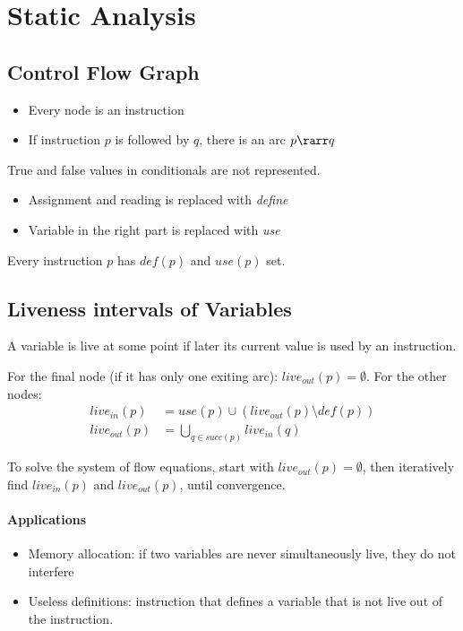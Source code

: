 \section{Static Analysis}

\subsection{Control Flow Graph}
\begin{itemize}
    \item Every node is an instruction
    \item If instruction $p$ is followed by $q$, there is an arc $p\rarr q$
\end{itemize}

True and false values in conditionals are not represented.
\begin{itemize}
    \item Assignment and reading is replaced with \emph{define}
    \item Variable in the right part is replaced with \emph{use}
\end{itemize}

Every instruction $p$ has $def(p)$ and $use(p)$ set.

\subsection{Liveness intervals of Variables}
A variable is live at some point if later its current value is used by an instruction.

For the final node (if it has only one exiting arc): $live_{out}(p) = \emptyset$. For the other nodes:
\begin{align*}
    live_{in}(p) &= use(p) \cup (live_{out}(p) \setminus def(p)) \\
    live_{out}(p) &= \bigcup_{q\in succ(p)} live_{in}(q)
\end{align*}

To solve the system of flow equations, start with $live_{out}(p) = \emptyset$, then iteratively find $live_{in}(p)$ and $live_{out}(p)$, until convergence.

\paragraph{Applications}
\begin{itemize}
    \item Memory allocation: if two variables are never simultaneously live, they do not interfere
    \item Useless definitions: instruction that defines a variable that is not live out of the instruction.
\end{itemize}

